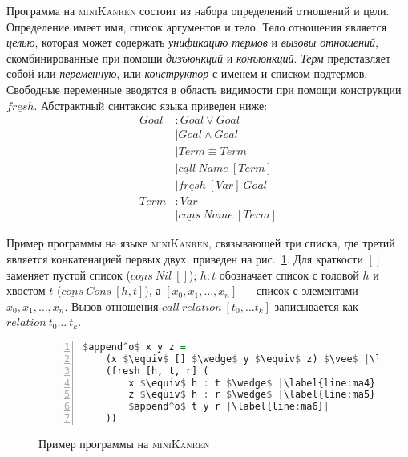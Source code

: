 \documentclass[conference,a4paper,american,russian]{IEEEtran}
\newcommand{\miniKanren}{\textsc{miniKanren}}
\begin{document}
Программа на \miniKanren{} состоит из набора определений отношений и цели. 
Определение имеет имя, список аргументов и тело.
Тело отношения является \textit{целью}, которая может содержать \textit{унификацию термов} и \textit{вызовы отношений}, скомбинированные при помощи \textit{дизъюнкций} и \textit{конъюнкций}. 
\textit{Терм} представляет собой или \textit{переменную}, или \textit{конструктор} с именем и списком подтермов. 
Свободные переменные вводятся в область видимости при помощи конструкции $\underline{fresh}$. 
Абстрактный синтаксис языка приведен ниже:
\begin{align*}
  Goal &: Goal \vee Goal \\
       &\mid Goal \wedge Goal \\
       &\mid Term \equiv Term \\
       &\mid \underline{call} \ Name \ [Term] \\
       &\mid \underline{fresh} \ [Var] \ Goal \\
  Term &: Var \\ 
       &\mid \underline{cons} \ Name \ [Term]
\end{align*}

Пример программы на языке \miniKanren{}, связывающей три списка, где третий является конкатенацией первых двух, приведен на рис.~\ref{lst:appendoDEF}. 
Для краткости $[]$ заменяет пустой список ($\underline{cons} \ Nil \ []$); $h : t$ обозначает список с головой $h$ и хвостом $t$ ($\underline{cons} \ Cons \ [h, t]$), а $[x_0, x_1, \dots, x_n]$ --- список с элементами $x_0, x_1, \dots, x_n$. 
Вызов отношения $\underline{call} \ relation \ [t_0, \dots t_k]$ записывается как $relation \ t_0 \dots \ t_k$.

\begin{figure}[h!]
  \begin{center}
  \begin{minipage}{0.3\textwidth}
  \begin{lstlisting}[language=Haskell, frame=single, numbers=left,numberstyle=\small, escapechar=|]
  $append^o$ x y z =
    (x $\equiv$ [] $\wedge$ y $\equiv$ z) $\vee$ |\label{line:ma2}|
    (fresh [h, t, r] (
        x $\equiv$ h : t $\wedge$ |\label{line:ma4}|
        z $\equiv$ h : r $\wedge$ |\label{line:ma5}|
        $append^o$ t y r |\label{line:ma6}|
    ))
    \end{lstlisting}
  \end{minipage}
  \end{center}
  \caption{Пример программы на \miniKanren{}}
  \label{lst:appendoDEF}
\end{figure}
\end{document}
